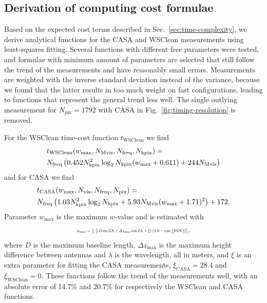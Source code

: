 \documentclass[useAMS,usenatbib]{mn2e}
\begin{document}

\subsection{Derivation of computing cost formulae}
Based on the expected cost terms described in Sec.~\ref{sec:time-complexity}, we derive analytical functions for the CASA and WSClean measurements using least-squares fitting. Several functions with different free parameters were tested, and formulae with minimum amount of parameters are selected that still follow the trend of the measurements and have reasonably small errors. Measurements are weighted with the inverse standard deviation instead of the variance, because we found that the latter results in too much weight on fast configurations, leading to functions that represent the general trend less well. The single outlying measurement for $N_\textrm{pix}=1792$ with CASA in Fig.~\ref{fig:timing-resolution} is removed.

For the WSClean time-cost function $t_\textrm{WSClean}$ we find 
\begin{align}\label{eq:wsclean-computing-cost}
& t_\textrm{WSClean} (w_{\max},N_\textrm{Mvis},N_\textrm{freq},N_\textrm{kpix}) = \\ \notag%
& N_\textrm{freq} \left( 0.452 N_\textrm{kpix}^2 \log_2 N_\textrm{kpix} (w_{\max} + 0.611) + 244 N_\textrm{Mvis} \right)
\end{align}
and for CASA we find
\begin{align}\label{eq:casa-computing-cost}
& t_\textrm{CASA}(w_{\max},N_\textrm{vis},N_\textrm{freq},N_\textrm{pix}) = \\ \notag%
& N_\textrm{freq} \left(1.03 N_\textrm{kpix}^2 \log_2 N_\textrm{kpix} + 5.93 N_\textrm{Mvis} (w_{\max} + 1.71)^2\right) + 172.
\label{eq:casa-computing-cost}%
\end{align}
Parameter $w_{\max}$ is the maximum $w$-value and is estimated with
\begin{equation}\resizebox{0.45\textwidth}{!}{$
 w_{\max} = \frac{1}{\lambda}\left[(D \sin \textrm{ZA} + \Delta z_{\max} \cos \textrm{ZA} + \xi) \left(1.0 - \cos(\frac{1}{2}\textrm{FOV})\right)\right]$},
\end{equation}%
where $D$ is the maximum baseline length, $\Delta z_{\max}$ is the maximum height difference between antennas and $\lambda$ is the wavelength, all in meters, and $\xi$ is an extra parameter for fitting the CASA measurements, $\xi_\textrm{CASA}=28.4$ and $\xi_\textrm{WSClean}=0$. These functions follow the trend of the measurements well, with an absolute error of 14.7\% and 20.7\% for respectively the WSClean and CASA functions.
\end{document}
